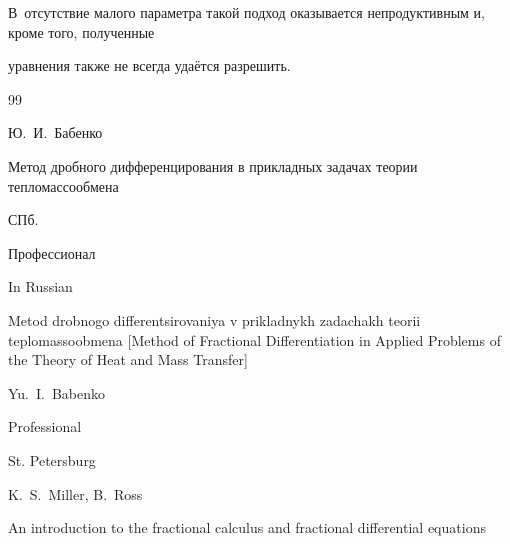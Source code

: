 В~отсутствие малого параметра такой подход оказывается непродуктивным и, кроме того, полученные

уравнения также не всегда удаётся разрешить.



\begin{thebibliography}{99}




\by Ю.~И.~Бабенко

\book Метод дробного дифференцирования в прикладных задачах теории тепломассообмена

\publaddr СПб.

\publ Профессионал



\misctransl

\lang In Russian

\book Metod drobnogo differentsirovaniya v prikladnykh zadachakh teorii teplomassoobmena \rm [Method of Fractional Differentiation in Applied Problems of the Theory of Heat and Mass Transfer]

\by Yu.~I.~Babenko

\publ Professional

\publaddr St. Petersburg




















\by K.~S.~Miller, B.~Ross

\book An introduction to the fractional calculus and fractional differential equations


\end{thebibliography}

